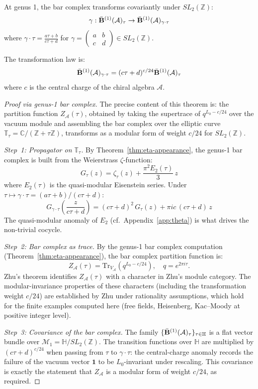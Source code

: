 \begin{theorem}\label{thm:modular-invariance}
At genus 1, the bar complex transforms covariantly under $SL_2(\mathbb{Z})$:
\[\gamma: \bar{\mathbf{B}}^{(1)}(\mathcal{A})_\tau \to \bar{\mathbf{B}}^{(1)}(\mathcal{A})_{\gamma \cdot \tau}\]
where $\gamma \cdot \tau = \frac{a\tau + b}{c\tau + d}$ for $\gamma = \begin{pmatrix} a & b \\ c & d \end{pmatrix} \in SL_2(\mathbb{Z})$.

The transformation law is:
\[\bar{\mathbf{B}}^{(1)}(\mathcal{A})_{\gamma \cdot \tau} = (c\tau + d)^{c/24} \bar{\mathbf{B}}^{(1)}(\mathcal{A})_\tau\]
where $c$ is the central charge of the chiral algebra $\mathcal{A}$.
\end{theorem}

\begin{proof}[Proof via genus-1 bar complex]
The precise content of this theorem is: the partition function $Z_\mathcal{A}(\tau)$, obtained by taking the supertrace of $q^{L_0 - c/24}$ over the vacuum module and assembling the bar complex over the elliptic curve $\mathbb{T}_\tau = \mathbb{C}/(\mathbb{Z} + \tau\mathbb{Z})$, transforms as a modular form of weight $c/24$ for $SL_2(\mathbb{Z})$.

\emph{Step~1: Propagator on $\mathbb{T}_\tau$.}
By Theorem~\ref{thm:eta-appearance}, the genus-1 bar complex is built from the Weierstrass $\zeta$-function:
\[
G_\tau(z) = \zeta_\tau(z) + \frac{\pi^2 E_2(\tau)}{3}\,z
\]
where $E_2(\tau)$ is the quasi-modular Eisenstein series.  Under $\tau \mapsto \gamma\cdot\tau = (a\tau+b)/(c\tau+d)$:
\[
G_{\gamma\cdot\tau}\!\left(\frac{z}{c\tau+d}\right) = (c\tau+d)^2\,G_\tau(z) + \pi i c\,(c\tau+d)\,z
\]
The quasi-modular anomaly of $E_2$ (cf.\ Appendix~\ref{app:theta}) is what drives the non-trivial cocycle.

\emph{Step~2: Bar complex as trace.}
By the genus-1 bar complex computation (Theorem~\ref{thm:eta-appearance}), the bar complex partition function is:
\[
Z_\mathcal{A}(\tau) = \mathrm{Tr}_{V_\mathcal{A}}\!\left(q^{L_0 - c/24}\right), \quad q = e^{2\pi i \tau}.
\]
Zhu's theorem \cite{Zhu96} identifies $Z_\mathcal{A}(\tau)$ with a character in Zhu's module category.  The modular-invariance properties of these characters (including the transformation weight $c/24$) are established by Zhu \cite[Thm.~4.4.2]{Zhu96} under rationality assumptions, which hold for the finite examples computed here (free fields, Heisenberg, Kac--Moody at positive integer level).

\emph{Step~3: Covariance of the bar complex.}
The family $\{\bar{\mathbf{B}}^{(1)}(\mathcal{A})_\tau\}_{\tau \in \mathbb{H}}$ is a flat vector bundle over $\mathcal{M}_1 = \mathbb{H}/SL_2(\mathbb{Z})$.  The transition functions over $\mathbb{H}$ are multiplied by $(c\tau+d)^{c/24}$ when passing from $\tau$ to $\gamma\cdot\tau$: the central-charge anomaly records the failure of the vacuum vector $\mathbf{1}$ to be $L_0$-invariant under rescaling.  This covariance is exactly the statement that $Z_\mathcal{A}$ is a modular form of weight $c/24$, as required.
\end{proof}

